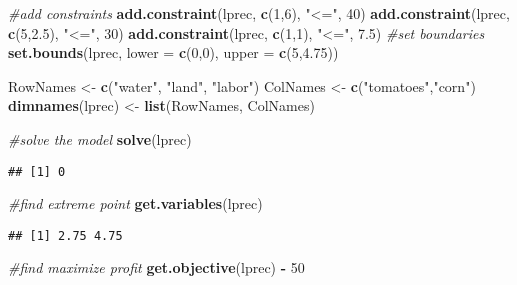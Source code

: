 \documentclass[]{article}
\newenvironment{Shaded}{\begin{snugshade}}{\end{snugshade}}
\newcommand{\KeywordTok}[1]{\textcolor[rgb]{0.13,0.29,0.53}{\textbf{#1}}}
\newcommand{\DataTypeTok}[1]{\textcolor[rgb]{0.13,0.29,0.53}{#1}}
\newcommand{\DecValTok}[1]{\textcolor[rgb]{0.00,0.00,0.81}{#1}}
\newcommand{\FloatTok}[1]{\textcolor[rgb]{0.00,0.00,0.81}{#1}}
\newcommand{\StringTok}[1]{\textcolor[rgb]{0.31,0.60,0.02}{#1}}
\newcommand{\CommentTok}[1]{\textcolor[rgb]{0.56,0.35,0.01}{\textit{#1}}}
\newcommand{\OperatorTok}[1]{\textcolor[rgb]{0.81,0.36,0.00}{\textbf{#1}}}
\newcommand{\NormalTok}[1]{#1}
\begin{document}
\begin{Shaded}
\begin{Highlighting}[]
\CommentTok{#add constraints}
\KeywordTok{add.constraint}\NormalTok{(lprec, }\KeywordTok{c}\NormalTok{(}\DecValTok{1}\NormalTok{,}\DecValTok{6}\NormalTok{), }\StringTok{"<="}\NormalTok{, }\DecValTok{40}\NormalTok{)}
\KeywordTok{add.constraint}\NormalTok{(lprec, }\KeywordTok{c}\NormalTok{(}\DecValTok{5}\NormalTok{,}\FloatTok{2.5}\NormalTok{), }\StringTok{"<="}\NormalTok{, }\DecValTok{30}\NormalTok{)}
\KeywordTok{add.constraint}\NormalTok{(lprec, }\KeywordTok{c}\NormalTok{(}\DecValTok{1}\NormalTok{,}\DecValTok{1}\NormalTok{), }\StringTok{"<="}\NormalTok{, }\FloatTok{7.5}\NormalTok{)}
\CommentTok{#set boundaries}
\KeywordTok{set.bounds}\NormalTok{(lprec, }\DataTypeTok{lower =} \KeywordTok{c}\NormalTok{(}\DecValTok{0}\NormalTok{,}\DecValTok{0}\NormalTok{), }\DataTypeTok{upper =} \KeywordTok{c}\NormalTok{(}\DecValTok{5}\NormalTok{,}\FloatTok{4.75}\NormalTok{))}

\NormalTok{RowNames <-}\StringTok{ }\KeywordTok{c}\NormalTok{(}\StringTok{"water"}\NormalTok{, }\StringTok{"land"}\NormalTok{, }\StringTok{"labor"}\NormalTok{)}
\NormalTok{ColNames <-}\StringTok{ }\KeywordTok{c}\NormalTok{(}\StringTok{"tomatoes"}\NormalTok{,}\StringTok{"corn"}\NormalTok{)}
\KeywordTok{dimnames}\NormalTok{(lprec) <-}\StringTok{ }\KeywordTok{list}\NormalTok{(RowNames, ColNames)}

\CommentTok{#solve the model}
\KeywordTok{solve}\NormalTok{(lprec)}
\end{Highlighting}
\end{Shaded}

\begin{verbatim}
## [1] 0
\end{verbatim}

\begin{Shaded}
\begin{Highlighting}[]
\CommentTok{#find extreme point}
\KeywordTok{get.variables}\NormalTok{(lprec)}
\end{Highlighting}
\end{Shaded}

\begin{verbatim}
## [1] 2.75 4.75
\end{verbatim}

\begin{Shaded}
\begin{Highlighting}[]
\CommentTok{#find maximize profit}
\KeywordTok{get.objective}\NormalTok{(lprec) }\OperatorTok{-}\StringTok{ }\DecValTok{50}
\end{Highlighting}
\end{Shaded}
\end{document}
